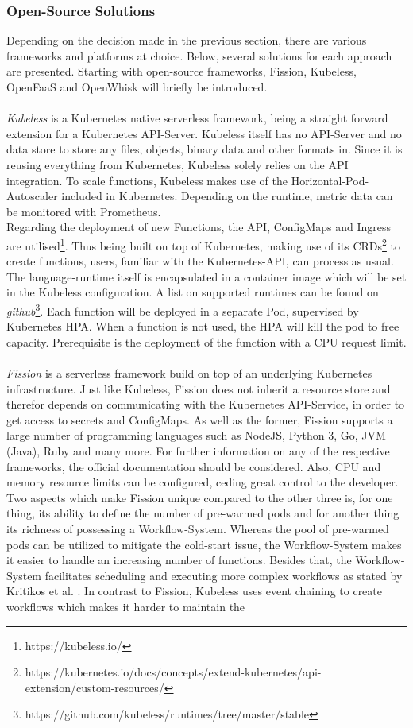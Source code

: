 \documentclass[a4paper,11pt, pagesize]{scrartcl}
\begin{document}
\begin{spacing}{1.2}
\subsubsection{Open-Source Solutions}
Depending on the decision made in the previous section, there are various frameworks and platforms at choice. Below, several solutions for each approach are presented. Starting with open-source frameworks, Fission, Kubeless, OpenFaaS and OpenWhisk will briefly be introduced.\\\\ \textit{Kubeless} is a Kubernetes native serverless framework, being a straight forward extension for a Kubernetes API-Server. Kubeless itself has no API-Server and no data store to store any files, objects, binary data and other formats in. Since it is reusing everything from Kubernetes, Kubeless solely relies on the API integration. To scale functions, Kubeless makes use of the Horizontal-Pod-Autoscaler included in Kubernetes. Depending on the runtime, metric data can be monitored with Prometheus.\\Regarding the deployment of new Functions, the API, ConfigMaps and Ingress are utilised\footnote{https://kubeless.io/}. Thus being built on top of Kubernetes, making use of its CRDs\footnote{https://kubernetes.io/docs/concepts/extend-kubernetes/api-extension/custom-resources/} to create functions, users, familiar with the Kubernetes-API, can process as usual. The language-runtime itself is encapsulated in a container image which will be set in the Kubeless configuration. A list on supported runtimes can be found on \textit{github}\footnote{https://github.com/kubeless/runtimes/tree/master/stable}. Each function will be deployed in a separate Pod, supervised by Kubernetes HPA. When a function is not used, the HPA will kill the pod to free capacity. Prerequisite is the deployment of the function with a CPU request limit.\\\\ \textit{Fission} is a serverless framework build on top of an underlying Kubernetes infrastructure. Just like Kubeless, Fission does not inherit a resource store and therefor depends on communicating with the Kubernetes API-Service, in order to get access to secrets and ConfigMaps. As well as the former, Fission supports a large number of programming languages such as NodeJS, Python 3, Go, JVM (Java), Ruby and many more. For further information on any of the respective frameworks, the official documentation should be considered. Also, CPU and memory resource limits can be configured, ceding great control to the developer. Two aspects which make Fission unique compared to the other three is, for one thing, its ability to define the number of pre-warmed pods and for another thing its richness of possessing a Workflow-System. Whereas the pool of pre-warmed pods can be utilized to mitigate the cold-start issue, the Workflow-System makes it easier to handle an increasing number of functions. Besides that, the Workflow-System facilitates scheduling and executing more complex workflows as stated by Kritikos et al. \cite{kritikos2018review}. In contrast to Fission, Kubeless uses event chaining to create workflows which makes it harder to maintain the 
\end{spacing}
\end{document}

